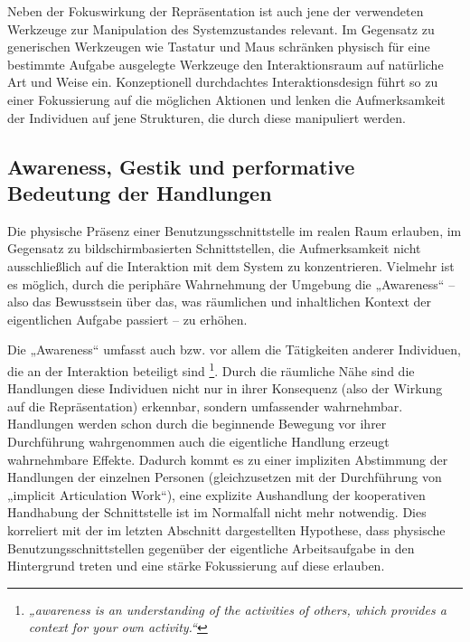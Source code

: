 Neben der Fokuswirkung der Repräsentation ist auch jene der verwendeten Werkzeuge zur Manipulation des Systemzustandes relevant. Im Gegensatz zu generischen Werkzeugen wie Tastatur und Maus schränken physisch für eine bestimmte Aufgabe ausgelegte Werkzeuge den Interaktionsraum auf natürliche Art und Weise ein. Konzeptionell durchdachtes Interaktionsdesign führt so zu einer Fokussierung auf die möglichen Aktionen und lenken die Aufmerksamkeit der Individuen auf jene Strukturen, die durch diese manipuliert werden.


\subsection{Awareness, Gestik und performative Bedeutung der Handlungen} %
\label{sub:awareness_gestik_und_performative_bedeutung_der_handlungen}

Die physische Präsenz einer Benutzungsschnittstelle im realen Raum erlauben, im Gegensatz zu bildschirmbasierten Schnittstellen, die Aufmerksamkeit nicht ausschließlich auf die Interaktion mit dem System zu konzentrieren. Vielmehr ist es möglich, durch die periphäre Wahrnehmung der Umgebung die „Awareness“ \citep{Dourish92} -- also das Bewusstsein über das, was räumlichen und inhaltlichen Kontext der eigentlichen Aufgabe passiert -- zu erhöhen. 

Die „Awareness“ umfasst auch bzw. vor allem die Tätigkeiten anderer Individuen, die an der Interaktion beteiligt sind \footnote{\emph{„awareness is an understanding of the activities of others, which provides a context for your own activity.“}\citep[][S. 1]{Dourish92}}. Durch die räumliche Nähe sind die Handlungen diese Individuen nicht nur in ihrer Konsequenz (also der Wirkung auf die Repräsentation) erkennbar, sondern umfassender wahrnehmbar. Handlungen werden schon durch die beginnende Bewegung vor ihrer Durchführung wahrgenommen auch die eigentliche Handlung erzeugt wahrnehmbare Effekte. Dadurch kommt es zu einer impliziten Abstimmung der Handlungen der einzelnen Personen (gleichzusetzen mit der Durchführung von „implicit Articulation Work“), eine explizite Aushandlung der kooperativen Handhabung der Schnittstelle ist im Normalfall nicht mehr notwendig. Dies korreliert mit der im letzten Abschnitt dargestellten Hypothese, dass physische Benutzungsschnittstellen gegenüber der eigentliche Arbeitsaufgabe in den Hintergrund treten und eine stärke Fokussierung auf diese erlauben.


